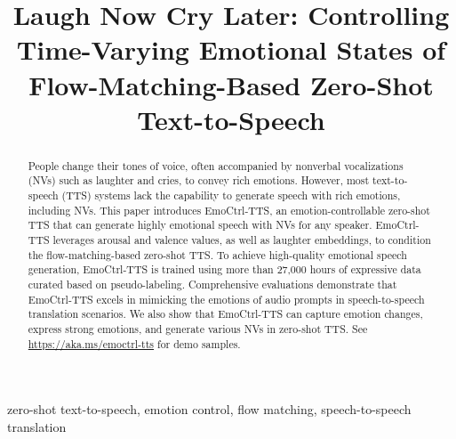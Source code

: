 \documentclass{article}
\title{Laugh Now Cry Later: Controlling Time-Varying Emotional States of Flow-Matching-Based Zero-Shot Text-to-Speech}
\begin{document}
\ninept
%
\maketitle
%
\begin{abstract}


People change their tones of voice, often accompanied by nonverbal vocalizations (NVs) such as laughter and cries, to convey rich emotions. However, most text-to-speech (TTS) systems lack the capability to generate speech with rich emotions, including NVs. This paper introduces EmoCtrl-TTS, an emotion-controllable zero-shot TTS that can generate highly emotional speech with NVs for any speaker. EmoCtrl-TTS leverages arousal and valence values, as well as laughter embeddings, to condition the flow-matching-based zero-shot TTS. To achieve high-quality emotional speech generation, EmoCtrl-TTS is trained using more than 27,000 hours of expressive data curated based on pseudo-labeling.  Comprehensive evaluations demonstrate that EmoCtrl-TTS excels in mimicking the emotions of audio prompts in speech-to-speech translation scenarios. We also show that EmoCtrl-TTS can capture emotion changes, express strong emotions, and generate various NVs in zero-shot TTS. See \url{https://aka.ms/emoctrl-tts} for demo samples.

\end{abstract}
%
\begin{keywords}
zero-shot text-to-speech, emotion control, flow matching, speech-to-speech translation
\end{keywords}














\end{document}
